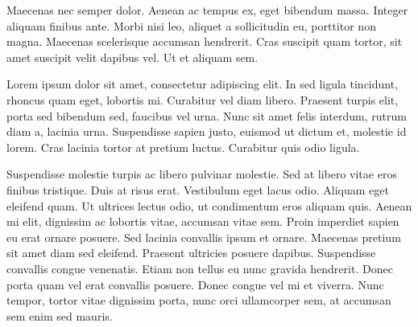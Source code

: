 Maecenas nec semper dolor. Aenean ac tempus ex, eget bibendum massa. Integer aliquam finibus ante. Morbi nisi leo, aliquet a sollicitudin eu, porttitor non magna. Maecenas scelerisque accumsan hendrerit. Cras suscipit quam tortor, sit amet suscipit velit dapibus vel. Ut et aliquam sem.

Lorem ipsum dolor sit amet, consectetur adipiscing elit. In sed ligula tincidunt, rhoncus quam eget, lobortis mi. Curabitur vel diam libero. Praesent turpis elit, porta sed bibendum sed, faucibus vel urna. Nunc sit amet felis interdum, rutrum diam a, lacinia urna. Suspendisse sapien justo, euismod ut dictum et, molestie id lorem. Cras lacinia tortor at pretium luctus. Curabitur quis odio ligula.

Suspendisse molestie turpis ac libero pulvinar molestie. Sed at libero vitae eros finibus tristique. Duis at risus erat. Vestibulum eget lacus odio. Aliquam eget eleifend quam. Ut ultrices lectus odio, ut condimentum eros aliquam quis. Aenean mi elit, dignissim ac lobortis vitae, accumsan vitae sem. Proin imperdiet sapien eu erat ornare posuere. Sed lacinia convallis ipsum et ornare. Maecenas pretium sit amet diam sed eleifend. Praesent ultricies posuere dapibus. Suspendisse convallis congue venenatis. Etiam non tellus eu nunc gravida hendrerit. Donec porta quam vel erat convallis posuere. Donec congue vel mi et viverra. Nunc tempor, tortor vitae dignissim porta, nunc orci ullamcorper sem, at accumsan sem enim sed mauris. 


